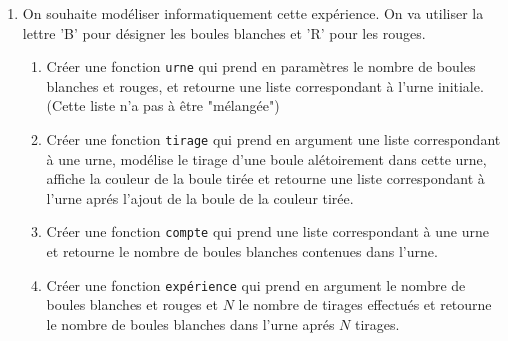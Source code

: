 \begin{exercice}
\begin{enumerate}
\item On souhaite modéliser informatiquement cette expérience. On va utiliser la lettre 'B' pour désigner les boules blanches et 'R' pour les rouges. 
\begin{enumerate}
\item Créer une fonction \texttt{urne} qui prend en paramètres le nombre de boules blanches et rouges, et retourne une liste correspondant à l'urne initiale. (Cette  liste n'a pas à être "mélangée")
\item Créer une fonction \texttt{tirage} qui prend en argument une liste correspondant à une urne, modélise le tirage d'une boule alétoirement dans cette urne, affiche la couleur de la boule tirée et retourne une liste correspondant à l'urne aprés l'ajout de la boule de la couleur tirée. 
\item Créer une fonction \texttt{compte} qui prend une liste correspondant à une urne et retourne   le nombre de  boules blanches  contenues dans l'urne. 
\item Créer une fonction \texttt{expérience} qui prend en argument le nombre de boules blanches et rouges et $N$ le nombre de tirages effectués et retourne le nombre de boules blanches dans l'urne aprés $N$ tirages. 
\end{enumerate}
 
\end{enumerate}
\end{exercice}
